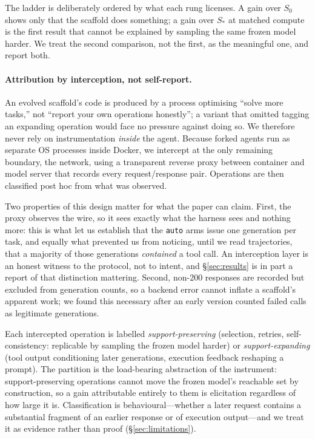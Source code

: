 \documentclass{article}
\newcommand{\Sz}{\ensuremath{S_0}}
\newcommand{\Sstar}{\ensuremath{S_*}}
\begin{document}
The ladder is deliberately ordered by what each rung licenses. A gain over
\Sz{} shows only that the scaffold does something; a gain over \Sstar{} at
matched compute is the first result that cannot be explained by sampling the
same frozen model harder. We treat the second comparison, not the first, as
the meaningful one, and report both.

\paragraph{Attribution by interception, not self-report.}
An evolved scaffold's code is produced by a process optimising ``solve more
tasks,'' not ``report your own operations honestly''; a variant that omitted
tagging an expanding operation would face no pressure against doing so. We
therefore never rely on instrumentation \emph{inside} the agent. Because
forked agents run as separate OS processes inside Docker, we intercept at the
only remaining boundary, the network, using a transparent reverse proxy
between container and model server that records every request/response pair.
Operations are then classified post hoc from what was observed.

Two properties of this design matter for what the paper can claim. First, the
proxy observes the wire, so it sees exactly what the harness sees and nothing
more: this is what let us establish that the \texttt{auto} arms issue one
generation per task, and equally what prevented us from noticing, until we
read trajectories, that a majority of those generations \emph{contained} a
tool call. An interception layer is an honest witness to the protocol, not to
intent, and \S\ref{sec:results} is in part a report of that distinction
mattering. Second, non-200 responses are recorded but excluded from
generation counts, so a backend error cannot inflate a scaffold's apparent
work; we found this necessary after an early version counted failed calls as
legitimate generations.

Each intercepted operation is labelled \emph{support-preserving} (selection,
retries, self-consistency: replicable by sampling the frozen model harder) or
\emph{support-expanding} (tool output conditioning later generations,
execution feedback reshaping a prompt). The partition is the load-bearing
abstraction of the instrument: support-preserving operations cannot move the
frozen model's reachable set by construction, so a gain attributable
entirely to them is elicitation regardless of how large it is. Classification
is behavioural---whether a later request contains a substantial fragment of
an earlier response or of execution output---and we treat it as evidence
rather than proof (\S\ref{sec:limitations}).
\end{document}

